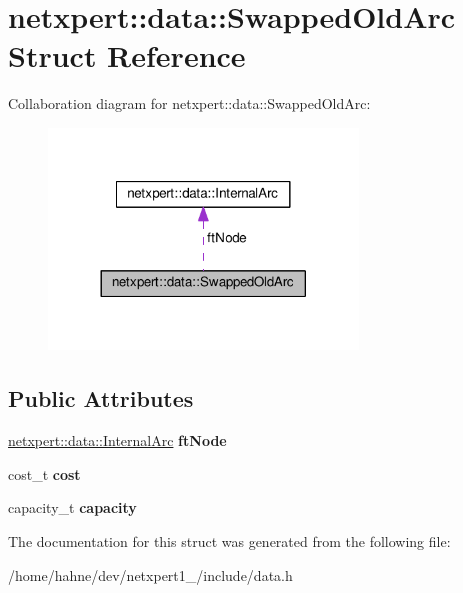 \hypertarget{structnetxpert_1_1data_1_1SwappedOldArc}{}\section{netxpert\+:\+:data\+:\+:Swapped\+Old\+Arc Struct Reference}
\label{structnetxpert_1_1data_1_1SwappedOldArc}


Collaboration diagram for netxpert\+:\+:data\+:\+:Swapped\+Old\+Arc\+:\nopagebreak
\begin{figure}[H]
\begin{center}
\leavevmode
\includegraphics[width=233pt]{structnetxpert_1_1data_1_1SwappedOldArc__coll__graph}
\end{center}
\end{figure}
\subsection*{Public Attributes}
\begin{DoxyCompactItemize}
\item 
\hyperlink{structnetxpert_1_1data_1_1InternalArc}{netxpert\+::data\+::\+Internal\+Arc} {\bfseries ft\+Node}\hypertarget{structnetxpert_1_1data_1_1SwappedOldArc_aa3bb7dae740bf01acc60a9aec78d30ea}{}\label{structnetxpert_1_1data_1_1SwappedOldArc_aa3bb7dae740bf01acc60a9aec78d30ea}

\item 
cost\+\_\+t {\bfseries cost}\hypertarget{structnetxpert_1_1data_1_1SwappedOldArc_af6a61426c54e165ec413fc255c70f6df}{}\label{structnetxpert_1_1data_1_1SwappedOldArc_af6a61426c54e165ec413fc255c70f6df}

\item 
capacity\+\_\+t {\bfseries capacity}\hypertarget{structnetxpert_1_1data_1_1SwappedOldArc_a4fae66455a864ceb03224842df4210da}{}\label{structnetxpert_1_1data_1_1SwappedOldArc_a4fae66455a864ceb03224842df4210da}

\end{DoxyCompactItemize}


The documentation for this struct was generated from the following file\+:\begin{DoxyCompactItemize}
\item 
/home/hahne/dev/netxpert1\+\_/include/data.\+h\end{DoxyCompactItemize}
